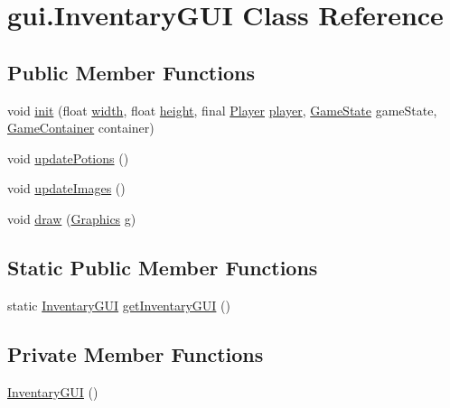 \hypertarget{classgui_1_1_inventary_g_u_i}{}\section{gui.\+Inventary\+G\+UI Class Reference}
\label{classgui_1_1_inventary_g_u_i}
\subsection*{Public Member Functions}
\begin{DoxyCompactItemize}
\item 
void \mbox{\hyperlink{classgui_1_1_inventary_g_u_i_a2b0a4381b602257e6c95d1522d22a243}{init}} (float \mbox{\hyperlink{classgui_1_1_inventary_g_u_i_a454d17df015be6ca0956ef602564be44}{width}}, float \mbox{\hyperlink{classgui_1_1_inventary_g_u_i_ad1560d70585e4b32cd613f5e1767e9ac}{height}}, final \mbox{\hyperlink{classentities_1_1_player}{Player}} \mbox{\hyperlink{classgui_1_1_inventary_g_u_i_ac788453bd94ba3fa6875e67fed92e1d7}{player}}, \mbox{\hyperlink{classstates_1_1_game_state}{Game\+State}} game\+State, \mbox{\hyperlink{classorg_1_1newdawn_1_1slick_1_1_game_container}{Game\+Container}} container)
\item 
void \mbox{\hyperlink{classgui_1_1_inventary_g_u_i_a0f9da0a1505dc29af480ff2c7e41e4d4}{update\+Potions}} ()
\item 
void \mbox{\hyperlink{classgui_1_1_inventary_g_u_i_ae5a22f3e705e5b36f844789ad23daeaa}{update\+Images}} ()
\item 
void \mbox{\hyperlink{classgui_1_1_inventary_g_u_i_acc977ebfefac72a3cd4cc02ace1f5f6c}{draw}} (\mbox{\hyperlink{classorg_1_1newdawn_1_1slick_1_1_graphics}{Graphics}} g)
\end{DoxyCompactItemize}
\subsection*{Static Public Member Functions}
\begin{DoxyCompactItemize}
\item 
static \mbox{\hyperlink{classgui_1_1_inventary_g_u_i}{Inventary\+G\+UI}} \mbox{\hyperlink{classgui_1_1_inventary_g_u_i_a702c72c2d3f5a149daa686209b24e4a9}{get\+Inventary\+G\+UI}} ()
\end{DoxyCompactItemize}
\subsection*{Private Member Functions}
\begin{DoxyCompactItemize}
\item 
\mbox{\hyperlink{classgui_1_1_inventary_g_u_i_aef89de77a50cd8f064bd17700951715b}{Inventary\+G\+UI}} ()
\end{DoxyCompactItemize}

